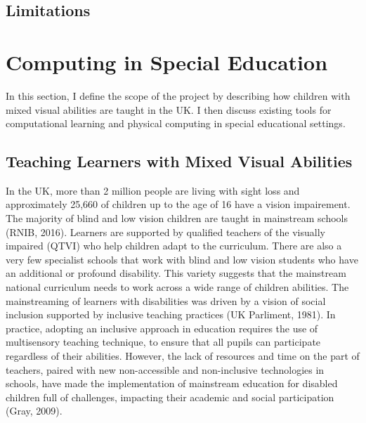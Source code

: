 \documentclass[oneside,%
                    author={Malak Hajji},
                    degree={BSc},
                    title={Designing An Accessible Computational Toolkit For Students},
                  subtitle={With Mixed Visual Abilities}]{dissertation}
\begin{document}
\subsection{Limitations}


\section{Computing in Special Education}
In this section, I define the scope of the project by describing how children with mixed visual abilities are taught in the UK.  I then discuss existing tools for computational learning and physical computing in special educational settings. 

\subsection{Teaching Learners with Mixed Visual Abilities}

In the UK, more than 2 million people are living with sight loss and approximately 25,660 of children up to the age of 16 have a vision impairement. The majority of blind and low vision children are taught in mainstream schools (RNIB, 2016). Learners are supported by qualified teachers of the visually impaired (QTVI) who help children adapt to the curriculum. There are also a very few specialist schools that work with blind and low vision students who have an additional or profound disability. This variety suggests that the mainstream national curriculum needs to work across a wide range of children abilities. 
The mainstreaming of learners with disabilities was driven by a vision of social inclusion supported by inclusive teaching practices (UK Parliment, 1981). 
In practice, adopting an inclusive approach in education requires the use of multisensory teaching technique, to ensure that all pupils can participate regardless of their abilities. However, the lack of resources and time on the part of teachers, paired with new non-accessible and non-inclusive technologies in schools, have made the implementation of mainstream education for disabled children full of challenges, impacting their academic and social participation (Gray, 2009). 
\end{document}
